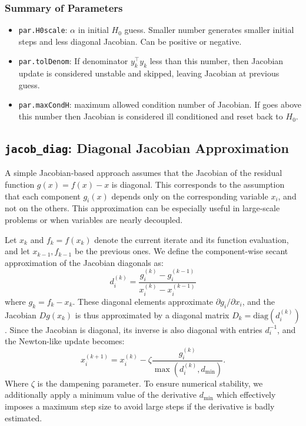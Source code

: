 \documentclass[a4paper,12pt]{article}
\newcommand{\code}[1]{\texttt{#1}}
\begin{document}
\subsubsection{Summary of Parameters}
\begin{itemize}
    \item \code{par.H0scale}: $\alpha$ in initial $H_0$ guess. Smaller number generates smaller initial steps and less diagonal Jacobian. Can be positive or negative. 
    \item \code{par.tolDenom}: If denominator $y_k^\top y_k$ less than this number, then Jacobian update is considered unstable and skipped, leaving Jacobian at previous guess. 
    \item \code{par.maxCondH}: maximum allowed condition number of Jacobian. If goes above this number then Jacobian is considered ill conditioned and reset back to $H_0$. 
\end{itemize}




\subsection{\code{jacob\_diag}: Diagonal Jacobian Approximation}

A simple Jacobian-based approach assumes that the Jacobian of the residual function \( g(x) = f(x) - x \) is diagonal. This corresponds to the assumption that each component \( g_i(x) \) depends only on the corresponding variable \( x_i \), and not on the others. This approximation can be especially useful in large-scale problems or when variables are nearly decoupled.

Let \( x_k \) and \( f_k = f(x_k) \) denote the current iterate and its function evaluation, and let \( x_{k-1}, f_{k-1} \) be the previous ones. We define the component-wise secant approximation of the Jacobian diagonals as:
\[
d_i^{(k)} = \frac{g_i^{(k)} - g_i^{(k-1)}}{x_i^{(k)} - x_i^{(k-1)}}
\]
where \( g_k = f_k - x_k \). These diagonal elements approximate \( \partial g_i / \partial x_i \), and the Jacobian \( Dg(x_k) \) is thus approximated by a diagonal matrix \( D_k = \mathrm{diag}(d_i^{(k)}) \). Since the Jacobian is diagonal, its inverse is also diagonal with entries \( d_i^{-1} \), and the Newton-like update becomes:
\[
x_i^{(k+1)} = x_i^{(k)} - \zeta \frac{g_i^{(k)}}{\max ( d_i^{(k)} , d_{\min})}.
\]
Where $\zeta$ is the dampening parameter. To ensure numerical stability, we additionally apply a minimum value of the derivative $d_{\min}$ which effectively imposes a maximum step size to avoid large steps if the derivative is badly estimated. 
\end{document}
